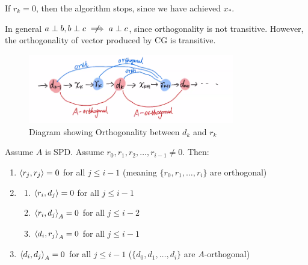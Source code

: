 \documentclass[../main/main.tex]{subfiles}
\begin{document}
    \begin{remark}
If $r_{k}=0$, then the algorithm stops, since we have achieved $x_{*}$.
    \end{remark}
    In general $a\perp b, b\perp c\centernot\implies a\perp c$, since orthogonality is not transitive. However, the orthogonality of vector produced by CG is transitive.
    \begin{figure}[htpb]
      \centering
      \includegraphics[width=0.8\textwidth]{../images/3-11-orth.png}
      \caption{Diagram showing Orthogonality between $d_{k}$ and $r_{k}$ }
    \end{figure}
    \begin{theorem}\label{3-11-th}
      Assume $A$ is SPD. Assume $r_{0},r_1,r_2, \ldots ,r_{i-1}\neq 0$. Then:
      \begin{enumerate}
\item $\left\langle{r_{j}},{r_{j}}\right\rangle = 0$ for all $j\leq  i-1$ (meaning $\{r_{0},r_{1}, \ldots , r_{i}\}$ are orthogonal)
        \item
              \begin{enumerate}
\item $\left\langle{r_{i}},{d_{j}}\right\rangle=0$ for all $j\leq  i-1$
\item $\left\langle{r_{i}},{d_{j}}\right\rangle_{A}=0$ for all $j\leq  i-2$
\item $\left\langle{d_{i}},{r_{j}}\right\rangle_{A}=0$ for all $j\leq  i-1$
              \end{enumerate}
              \item $\left\langle{d_{i}},{d_{j}}\right\rangle_{A}=0$ for all $j\leq i-1$ ($\{d_{0},d_{1}, \ldots , d_{i}\}$ are $A$-orthogonal)
      \end{enumerate}
    \end{theorem}
\end{document}
